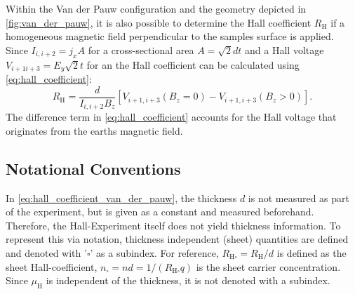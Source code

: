 Within the Van der Pauw configuration and the geometry depicted in 
\cref{fig:van_der_pauw}, it is also possible to determine the Hall 
coefficient $R_{\mathrm{H}}$ if a homogeneous magnetic field perpendicular to the 
samples surface is applied.
Since $I_{i, i+2}= j_x A$ for a cross-sectional area 
$A = \sqrt{2} d t$ and a Hall voltage $V_{i+1 i+3} = E_y \sqrt{2} t$ for an 
the Hall coefficient can be calculated using \cref{eq:hall_coefficient}:
\begin{equation}
	R_{\mathrm{H}}=\frac{d}{I_{i, i+2}B_{z}} 
	[V_{i+1, i+3}(B_{z}=0)-V_{i+1, i+3}(B_{z}>0)].
	\label{eq:hall_coefficient_van_der_pauw}
\end{equation}
The difference term in  \cref{eq:hall_coefficient} accounts for the Hall voltage that 
originates from the earths magnetic field.

\subsection{Notational Conventions}
In \cref{eq:hall_coefficient_van_der_pauw}, the thickness $d$ is
not measured as part of the experiment, but is given as a constant and measured
beforehand. 
Therefore, the Hall-Experiment itself does not yield thickness information.
To represent this via notation, thickness independent (sheet) quantities are defined and 
denoted with '$\square$' as a subindex.
For reference, $R_{\mathrm{H} \square}=R_\mathrm{H} / d$ is defined as the sheet 
Hall-coefficient, $n_\square = n d = 1 / (R_\mathrm{H \square}q)$ is the sheet carrier 
concentration. 
Since $\mu_\mathrm{H}$ is independent of the thickness, 
it is not denoted with a subindex.

